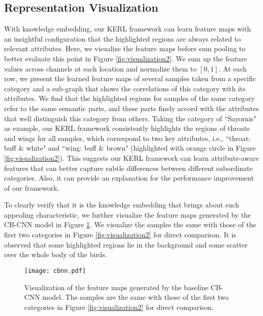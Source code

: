\documentclass{article}
\begin{document}
\subsection{Representation Visualization}
\label{RV}
With knowledge embedding, our KERL framework can learn feature maps with an insightful configuration that the highlighted regions are always related to relevant attributes. Here, we visualize the feature maps before sum pooling to better evaluate this point in Figure \ref{fig:visualization2}. We sum up the feature values across channels at each location and normalize them to $[0, 1]$. At each row, we present the learned feature maps of several samples taken from a specific category and a sub-graph that shows the correlations of this category with its attributes. We find that the highlighted regions for samples of the same category refer to the same semantic parts, and these parts finely accord with the attributes that well distinguish this category from others. Taking the category of ``Sayornis" as example, our KERL framework consistently highlights the regions of throats and wings for all samples, which correspond to two key attributes, i.e., ``throat: buff \& white" and ``wing: buff \& brown" (highlighted with orange circle in Figure \ref{fig:visualization2}). This suggests our KERL framework can learn attribute-aware features that can better capture subtle differences between different subordinate categories. Also, it can provide an explanation for the performance improvement of our framework. 

To clearly verify that it is the knowledge embedding that brings about such appealing characteristic, we further visualize the feature maps generated by the CB-CNN model in Figure \ref{fig:visualization3}. We visualize the samples the same with those of the first two categories in Figure \ref{fig:visualization2} for direct comparison. It is observed that some highlighted regions lie in the background and some scatter over the whole body of the birds.

\begin{figure}[htbp]
   \centering
   \texttt{[image: cbnn.pdf]} %
   \caption{Visualization of the feature maps generated by the baseline CB-CNN model. The samples are the same with those of the first two categories in Figure \ref{fig:visualization2} for direct comparison.}
   \label{fig:visualization3}
\end{figure}
\end{document}
